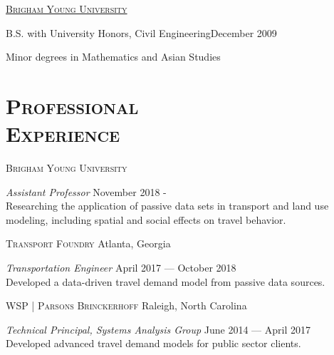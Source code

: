 \documentclass[margin,line]{res}
\newenvironment{list1}{
  \begin{list}{\ding{113}}{%
      \setlength{\itemsep}{0in}
      \setlength{\parsep}{0in} \setlength{\parskip}{0in}
      \setlength{\topsep}{0in} \setlength{\partopsep}{0in}
      \setlength{\leftmargin}{0.17in}}}{\end{list}}
\newenvironment{list2}{
  \begin{list}{$\bullet$}{%
      \setlength{\itemsep}{0in}
      \setlength{\parsep}{0in} \setlength{\parskip}{0in}
      \setlength{\topsep}{0in} \setlength{\partopsep}{0in}
      \setlength{\leftmargin}{0.2in}}}{\end{list}}
\newcommand{\secfont}{\scshape }
\newcommand{\acc}{\scshape }
\begin{document}
\begin{resume}
\href{http://www.byu.edu}{\acc Brigham Young University}
\\
\vspace*{-.1in}
\begin{list1}
  \item[] B.S. with University Honors, Civil Engineering\hfill December 2009
	\item[] Minor	degrees in Mathematics and Asian Studies
\end{list1}


\noindent\makebox[\linewidth]{\rule{\linewidth}{0.4pt}}
\section{\secfont Professional \\ Experience}
{\acc Brigham Young University}

\vspace{-.4cm}
\textit{Assistant Professor} \hfill {November 2018 - }\\
Researching the application of passive data sets in transport and land use
modeling, including spatial and social effects on travel behavior.

{\acc Transport Foundry} Atlanta, Georgia

\vspace{-.3cm}
\textit{Transportation Engineer} \hfill {April 2017 --- October 2018}\\
Developed a data-driven travel demand model from passive data sources.

{\acc WSP | Parsons Brinckerhoff} Raleigh, North Carolina

\vspace{-.3cm}
\textit{Technical Principal, Systems Analysis Group} \hfill {June 2014 --- April 2017}\\
Developed advanced travel demand models for public sector clients.


\end{resume}
\end{document}
